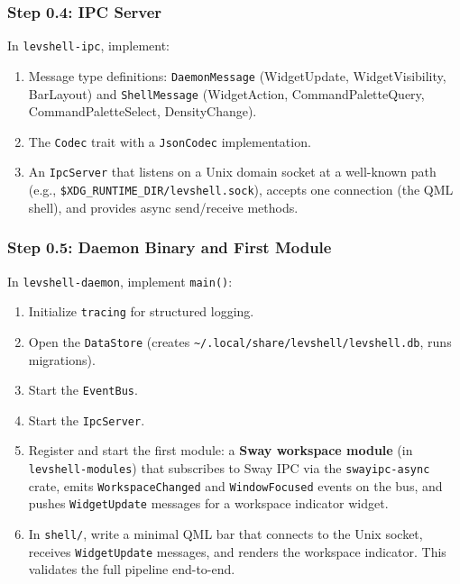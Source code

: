 \documentclass[11pt,a4paper]{article}
\begin{document}
\subsubsection{Step 0.4: IPC Server}

In \texttt{levshell-ipc}, implement:

\begin{enumerate}[leftmargin=1.5em, itemsep=2pt]
  \item Message type definitions: \texttt{DaemonMessage} (WidgetUpdate, WidgetVisibility, BarLayout) and \texttt{ShellMessage} (WidgetAction, CommandPaletteQuery, CommandPaletteSelect, DensityChange).
  \item The \texttt{Codec} trait with a \texttt{JsonCodec} implementation.
  \item An \texttt{IpcServer} that listens on a Unix domain socket at a well-known path (e.g., \texttt{\$XDG\_RUNTIME\_DIR/levshell.sock}), accepts one connection (the QML shell), and provides async send/receive methods.
\end{enumerate}

\subsubsection{Step 0.5: Daemon Binary and First Module}

In \texttt{levshell-daemon}, implement \texttt{main()}:

\begin{enumerate}[leftmargin=1.5em, itemsep=2pt]
  \item Initialize \texttt{tracing} for structured logging.
  \item Open the \texttt{DataStore} (creates \texttt{\textasciitilde/.local/share/levshell/levshell.db}, runs migrations).
  \item Start the \texttt{EventBus}.
  \item Start the \texttt{IpcServer}.
  \item Register and start the first module: a \textbf{Sway workspace module} (in \texttt{levshell-modules}) that subscribes to Sway IPC via the \texttt{swayipc-async} crate, emits \texttt{WorkspaceChanged} and \texttt{WindowFocused} events on the bus, and pushes \texttt{WidgetUpdate} messages for a workspace indicator widget.
  \item In \texttt{shell/}, write a minimal QML bar that connects to the Unix socket, receives \texttt{WidgetUpdate} messages, and renders the workspace indicator. This validates the full pipeline end-to-end.
\end{enumerate}
\end{document}
